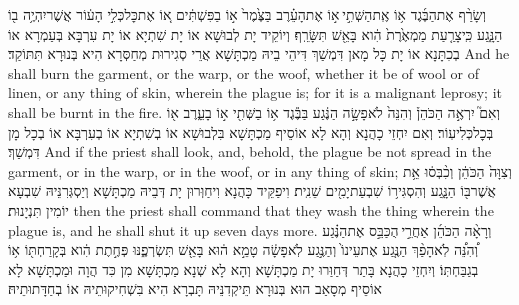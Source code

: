 {וְשָׂרַ֨ף אֶת\maqqaf הַבֶּ֜גֶד א֥וֹ אֶֽת\maqqaf הַשְּׁתִ֣י \legarmeh  א֣וֹ אֶת\maqqaf הָעֵ֗רֶב בַּצֶּ֙מֶר֙ א֣וֹ בַפִּשְׁתִּ֔ים א֚וֹ אֶת\maqqaf כׇּל\maqqaf כְּלִ֣י הָע֔וֹר אֲשֶׁר\maqqaf יִהְיֶ֥ה ב֖וֹ הַנָּ֑גַע כִּֽי\maqqaf צָרַ֤עַת מַמְאֶ֙רֶת֙ הִ֔וא בָּאֵ֖שׁ תִּשָּׂרֵֽף׃}
{וְיוֹקֵיד יָת לְבוּשָׁא אוֹ יָת שִׁתְיָא אוֹ יָת עִרְבָּא בְּעַמְרָא אוֹ בְכִתָּנָא אוֹ יָת כָּל מָאן דִּמְשַׁךְ דִּיהֵי בֵיהּ מַכְתָּשָׁא אֲרֵי סְגִירוּת מְחַסְּרָא הִיא בְּנוּרָא תִּתּוֹקַד׃}
{And he shall burn the garment, or the warp, or the woof, whether it be of wool or of linen, or any thing of skin, wherein the plague is; for it is a malignant leprosy; it shall be burnt in the fire.}{}
{וְאִם֮ יִרְאֶ֣ה הַכֹּהֵן֒ וְהִנֵּה֙ לֹא\maqqaf פָשָׂ֣ה הַנֶּ֔גַע בַּבֶּ֕גֶד א֥וֹ בַשְּׁתִ֖י א֣וֹ בָעֵ֑רֶב א֖וֹ בְּכׇל\maqqaf כְּלִי\maqqaf עֽוֹר׃}
{וְאִם יִחְזֵי כָהֲנָא וְהָא לָא אוֹסֵיף מַכְתָּשָׁא בִּלְבוּשָׁא אוֹ בְשִׁתְיָא אוֹ בְעִרְבָּא אוֹ בְכָל מָן דִּמְשַׁךְ׃}
{And if the priest shall look, and, behold, the plague be not spread in the garment, or in the warp, or in the woof, or in any thing of skin;}{}
{וְצִוָּה֙ הַכֹּהֵ֔ן וְכִ֨בְּס֔וּ אֵ֥ת אֲשֶׁר\maqqaf בּ֖וֹ הַנָּ֑גַע וְהִסְגִּיר֥וֹ שִׁבְעַת\maqqaf יָמִ֖ים שֵׁנִֽית׃}
{וִיפַקֵּיד כָּהֲנָא וִיחַוְּרוּן יָת דְּבֵיהּ מַכְתָּשָׁא וְיַסְגְּרִנֵּיהּ שִׁבְעָא יוֹמִין תִּנְיָנוּת׃}
{then the priest shall command that they wash the thing wherein the plague is, and he shall shut it up seven days more.}{}
{וְרָאָ֨ה הַכֹּהֵ֜ן אַחֲרֵ֣י \legarmeh  הֻכַּבֵּ֣ס אֶת\maqqaf הַנֶּ֗גַע וְ֠הִנֵּ֠ה לֹֽא\maqqaf הָפַ֨ךְ הַנֶּ֤גַע אֶת\maqqaf עֵינוֹ֙ וְהַנֶּ֣גַע לֹֽא\maqqaf פָשָׂ֔ה טָמֵ֣א ה֔וּא בָּאֵ֖שׁ תִּשְׂרְפֶ֑נּוּ פְּחֶ֣תֶת הִ֔וא בְּקָרַחְתּ֖וֹ א֥וֹ בְגַבַּחְתּֽוֹ׃}
{וְיִחְזֵי כָהֲנָא בָּתַר דְּחַוַּרוּ יָת מַכְתָּשָׁא וְהָא לָא שְׁנָא מַכְתָּשָׁא מִן כִּד הֲוָה וּמַכְתָּשָׁא לָא אוֹסֵיף מְסָאַב הוּא בְּנוּרָא תֵּיקְדִנֵּיהּ תָּבְרָא הִיא בִּשְׁחִיקוּתֵיהּ אוֹ בְחַדָּתוּתֵיהּ׃}
